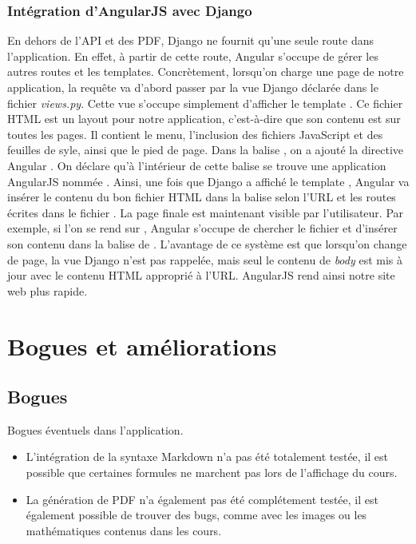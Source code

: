 \documentclass[a4paper,10pt,twoside]{sphinxmanual}
\begin{document}
\subsection{Intégration d'AngularJS avec Django}
\label{guide:integration-d-angularjs-avec-django}
En dehors de l'API et des PDF, Django ne fournit qu'une seule route dans l'application. En effet, à partir de cette route, Angular s'occupe de gérer les autres routes et les templates. Concrètement, lorsqu'on charge une page de notre application, la requête va d'abord passer par la vue Django  déclarée dans le fichier \emph{views.py}. Cette vue s'occupe simplement d'afficher le template . Ce fichier HTML est un layout pour notre application, c'est-à-dire que son contenu est sur toutes les pages. Il contient le menu, l'inclusion des fichiers JavaScript et des feuilles de syle, ainsi que le pied de page. Dans la balise , on a ajouté la directive Angular . On déclare qu'à l'intérieur de cette balise se trouve une application AngularJS nommée . Ainsi, une fois que Django a affiché le template , Angular va insérer le contenu du bon fichier HTML dans la balise  selon l'URL et les routes écrites dans le fichier . La page finale est maintenant visible par l'utilisateur. Par exemple, si l'on se rend sur , Angular s'occupe de chercher le fichier  et d'insérer son contenu dans la balise  de . L'avantage de ce système est que lorsqu'on change de page, la vue Django n'est pas rappelée, mais seul le contenu de \emph{body} est mis à jour avec le contenu HTML approprié à l'URL. AngularJS rend ainsi notre site web plus rapide.


\chapter{Bogues et améliorations}
\label{bugs::doc}\label{bugs:bogues-et-ameliorations}

\section{Bogues}
\label{bugs:bogues}
Bogues éventuels dans l'application.
\begin{itemize}
\item {} 
L'intégration de la syntaxe Markdown n'a pas été totalement testée, il est possible que certaines formules ne marchent pas lors de l'affichage du cours.

\item {} 
La génération de PDF n'a également pas été complétement testée, il est également possible de trouver des bugs, comme avec les images ou  les mathématiques contenus dans les cours.

\end{itemize}
\end{document}

